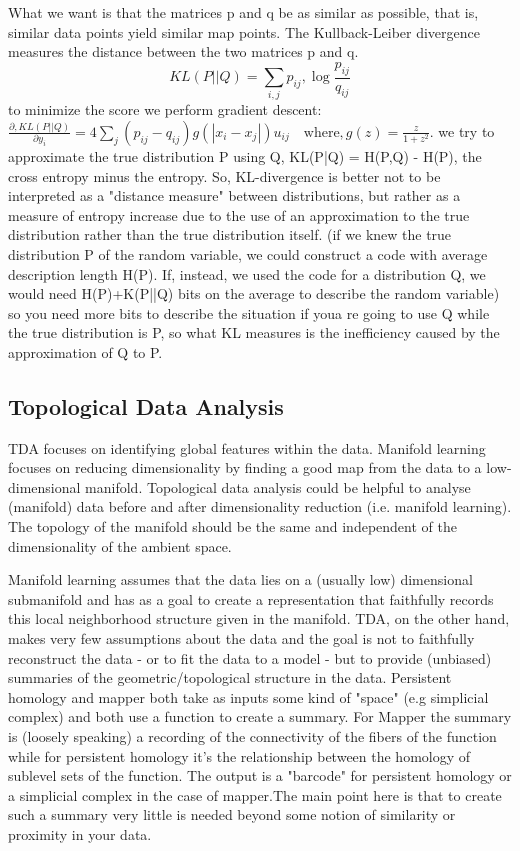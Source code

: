 \documentclass[12pt]{report}
\begin{document}
What we want is that the matrices p and q be as similar as possible, that is, similar data points yield similar map points.
The Kullback-Leiber divergence measures the distance between the two matrices p and q. 
\begin{equation}
KL(P||Q) = \sum_{i, j} p_{ij} , \log \frac{p_{ij}}{q_{ij}}
\end{equation}
to minimize the score we perform gradient descent:
\(\frac{\partial , KL(P || Q)}{\partial y_i} = 4 \sum_j (p_{ij} - q_{ij}) g\left( \left| x_i - x_j\right| \right) u_{ij} \quad \textrm{where} , g(z) = \frac{z}{1+z^2}.\)
we try to approximate the true distribution P using Q, KL(P|Q) = H(P,Q) - H(P), the cross entropy minus the entropy.
So, KL-divergence is better not to be interpreted as a "distance measure" between distributions, but rather as a measure of entropy increase due to the use of an approximation to the true distribution rather than the true distribution itself. (if we knew the true distribution P of the random variable, we could construct a code with average description length H(P). If, instead, we used the code for a distribution Q, we would need H(P)+K(P||Q) bits on the average to describe the random variable) so you need more bits to describe the situation if youa re going to use Q while the true distribution is P, so what KL measures is the inefficiency caused by the approximation of Q to P.

\subsection{Topological Data Analysis}
TDA focuses on identifying global features within the data.
Manifold learning focuses on reducing dimensionality by finding a good map from the data to a low-dimensional manifold. Topological data analysis could be helpful to analyse (manifold) data before and after dimensionality reduction (i.e. manifold learning). The topology of the manifold should be the same and independent of the dimensionality of the ambient space.

Manifold learning assumes that the data lies on a (usually low) dimensional submanifold and has as a goal to create a representation that faithfully records this local neighborhood structure given in the manifold. 
TDA, on the other hand, makes very few assumptions about the data and the goal is not to faithfully reconstruct the data - or to fit the data to a model - but to provide (unbiased) summaries of the geometric/topological structure in the data.
Persistent homology and mapper both take as inputs some kind of "space" (e.g simplicial complex) and both use a function to create a summary. For Mapper the summary is (loosely speaking) a recording of the connectivity of the fibers of the  function while for persistent homology it's the relationship between the homology of sublevel sets of the function. The output is a "barcode" for persistent homology or a simplicial complex in the case of mapper.The main point here is that to create such a summary very little is needed beyond some notion of similarity or proximity in your data.
\end{document}
